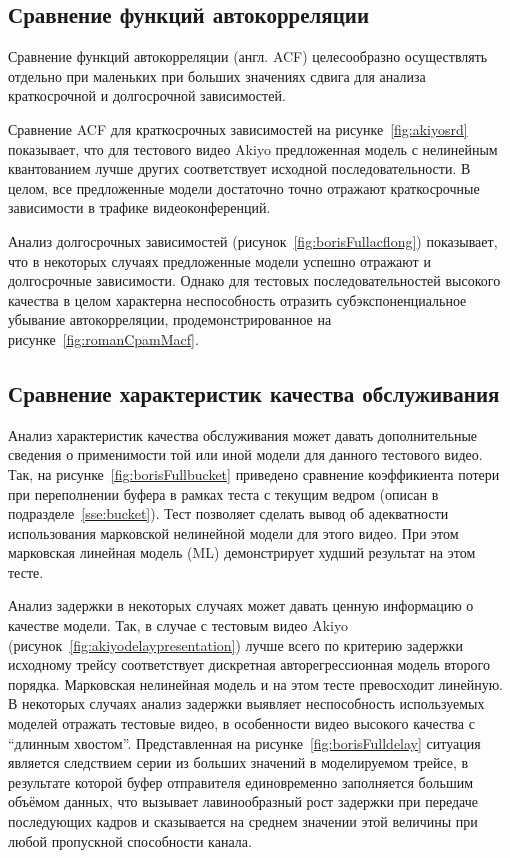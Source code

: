 \subsection{Сравнение функций автокорреляции}

Сравнение функций автокорреляции (англ. ACF) целесообразно осуществлять
отдельно при маленьких при больших значениях сдвига
для анализа краткосрочной и долгосрочной зависимостей.

Сравнение ACF для краткосрочных зависимостей на рисунке~\ref{fig:akiyosrd}
показывает, что для тестового видео Akiyo предложенная модель с
нелинейным квантованием лучше других соответствует исходной
последовательности. В целом, все предложенные модели достаточно
точно отражают краткосрочные зависимости в трафике видеоконференций.

Анализ долгосрочных зависимостей (рисунок~\ref{fig:borisFullacflong})
показывает, что в некоторых случаях предложенные модели
успешно отражают и долгосрочные зависимости. Однако
для тестовых последовательностей высокого качества в целом
характерна неспособность отразить субэкспоненциальное
убывание автокорреляции, продемонстрированное на рисунке~\ref{fig:romanCpamMacf}.

\subsection{Сравнение характеристик качества обслуживания}

Анализ характеристик качества обслуживания может давать
дополнительные сведения о применимости той или иной
модели для данного тестового видео. Так, на рисунке~\ref{fig:borisFullbucket}
приведено сравнение коэффикиента потери при переполнении буфера
в рамках теста с текущим ведром (описан в подразделе~\ref{sse:bucket}).
Тест позволяет сделать вывод об адекватности использования
марковской нелинейной модели для этого видео. При этом
марковская линейная модель (ML) демонстрирует худший результат
на этом тесте.

Анализ задержки в некоторых случаях может давать ценную информацию
о качестве модели. Так, в случае с тестовым видео Akiyo (рисунок~\ref{fig:akiyodelaypresentation})
лучше всего по критерию задержки исходному трейсу соответствует дискретная
авторегрессионная модель второго порядка. Марковская нелинейная модель и на этом
тесте превосходит линейную. В некоторых случаях анализ задержки выявляет
неспособность используемых моделей отражать тестовые видео, в особенности
видео высокого качества с ``длинным хвостом''. Представленная на рисунке~\ref{fig:borisFulldelay}
ситуация является следствием серии из больших значений в моделируемом трейсе,
в результате которой буфер отправителя единовременно заполняется большим объёмом данных,
что вызывает лавинообразный рост задержки при передаче последующих кадров и сказывается на среднем
значении этой величины при любой пропускной способности канала.

